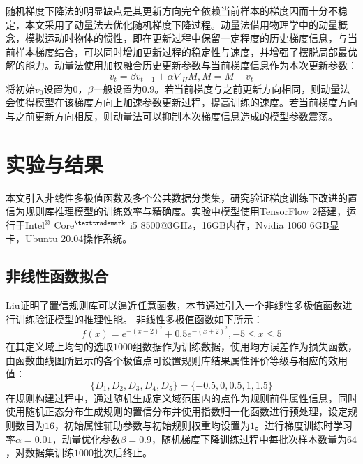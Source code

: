 \documentclass{cjc}
\begin{document}
随机梯度下降法的明显缺点是其更新方向完全依赖当前样本的梯度因而十分不稳定，本文采用了动量法\cite{a19}去优化随机梯度下降过程。动量法借用物理学中的动量概念，模拟运动时物体的惯性，即在更新过程中保留一定程度的历史梯度信息，与当前样本梯度结合，可以同时增加更新过程的稳定性与速度，并增强了摆脱局部最优解的能力。动量法使用加权融合历史更新参数与当前梯度信息作为本次更新参数：
$$v_t=\beta v_{t-1}+\alpha\nabla_HM,M=M-v_t$$
将初始$v_0$设置为$0$，$\beta$一般设置为$0.9$。若当前梯度与之前更新方向相同，则动量法会使得模型在该梯度方向上加速参数更新过程，提高训练的速度。若当前梯度方向与之前更新方向相反，则动量法可以抑制本次梯度信息造成的模型参数震荡。
\section{实验与结果}
本文引入非线性多极值函数及多个公共数据分类集，研究验证梯度训练下改进的置信为规则库推理模型的训练效率与精确度。实验中模型使用TensorFlow 2搭建，运行于Intel$^{\copyright}$ Core$^{\texttrademark}$ i5 8500@3GHz，16GB内存，Nvidia 1060 6GB显卡，Ubuntu 20.04操作系统。
\subsection{非线性函数拟合}
Liu\cite{a15}证明了置信规则库可以逼近任意函数，本节通过引入一个非线性多极值函数进行训练验证模型的推理性能。  
非线性多极值函数如下所示：
$$f(x)=e^{-(x-2)^2}+0.5e^{-(x+2)^2},-5\leq x\leq 5$$
在其定义域上均匀的选取$1000$组数据作为训练数据，使用均方误差作为损失函数，由函数曲线图所显示的各个极值点可设置规则库结果属性评价等级与相应的效用值：
$$\{D_1,D_2,D_3,D_4,D_5\}=\{-0.5,0,0.5,1,1.5\}$$
在规则构建过程中，通过随机生成定义域范围内的点作为规则前件属性信息，同时使用随机正态分布生成规则的置信分布并使用指数归一化函数进行预处理，设定规则数目为$16$，初始属性辅助参数与初始规则权重均设置为$1$。进行梯度训练时学习率$\alpha=0.01$，动量优化参数$\beta=0.9$，随机梯度下降训练过程中每批次样本数量为$64$，对数据集训练$1000$批次后终止。
\end{document}
